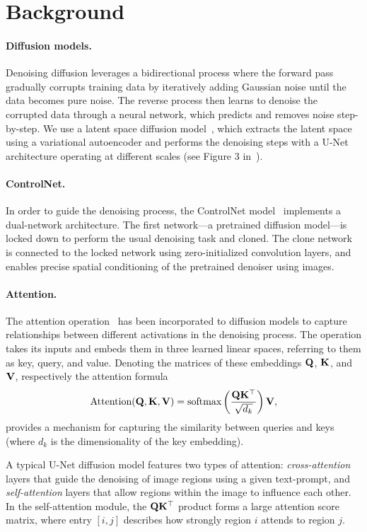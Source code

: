 \section{Background}
\label{sec:background}

\paragraph{Diffusion models.} Denoising diffusion leverages a bidirectional process
where the forward pass gradually corrupts training data by iteratively adding Gaussian noise until the data becomes pure noise.
The reverse process then learns to denoise the corrupted data through a neural network, which predicts and removes noise step-by-step.
We use a latent space diffusion model~\cite{rombach2022stablediffusion}, which extracts the latent space using a variational autoencoder and performs the denoising steps with a U-Net architecture operating at different scales (see Figure 3 in~\citet{rombach2022stablediffusion}).

\paragraph{ControlNet.} In order to guide the denoising process, the ControlNet model~\cite{controlnet} implements a dual-network architecture.
The first network---a pretrained diffusion model---is locked down to perform the usual denoising task and cloned.
The clone network is connected to the locked network using zero-initialized convolution layers,
and enables precise spatial conditioning of the pretrained denoiser using images.

\paragraph{Attention.}
The attention operation~\cite{Vaswani2017attention} has been incorporated to diffusion models to capture relationships between different activations in the denoising process.
The operation takes its inputs and embeds them in three learned linear spaces, referring to them as key, query, and value.
Denoting the matrices of these embeddings $\mathbf{Q}$, $\mathbf{K}$, and $\mathbf{V}$, respectively
the attention formula
\[
\text{Attention}(\mathbf{Q}, \mathbf{K}, \mathbf{V}) = \text{softmax}\left(\frac{\mathbf{Q} \mathbf{K}^\top}{\sqrt{d_k}}\right)\mathbf{V},
\]
provides a mechanism for capturing the similarity between queries and keys (where $d_k$ is the dimensionality of the key embedding).

A typical U-Net diffusion model features two types of attention:
\emph{cross-attention} layers that guide the denoising of image regions using a given text-prompt,
and \emph{self-attention} layers that allow regions within the image to influence each other.
In the self-attention module, the $\mathbf{Q} \mathbf{K}^\top$ product forms a large attention score matrix,
where entry $[i,j]$ describes how strongly region $i$ attends to region $j$.




